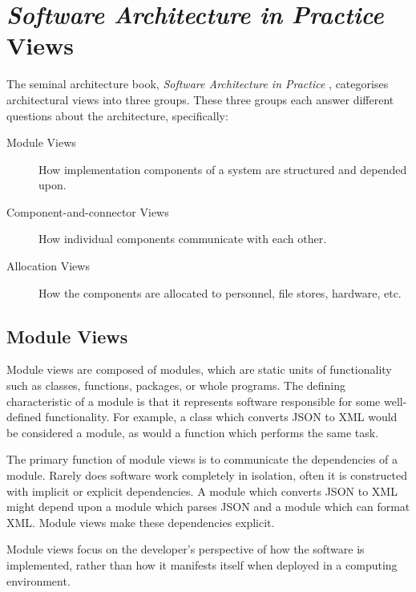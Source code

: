 \section{\textit{Software Architecture in Practice} Views}
The seminal architecture book, \textit{Software Architecture in Practice} \cite{bass2021software},
categorises architectural views into three groups.
These three groups each answer different questions about the architecture, specifically:
\begin{description}
    \item[Module Views] How implementation components of a system are structured and depended upon.
    \item[Component-and-connector Views] How individual components communicate with each other.
    \item[Allocation Views] How the components are allocated to personnel, file stores, hardware, etc.
\end{description}

\subsection{Module Views}
Module views are composed of modules, which are static units of functionality such as classes, functions, packages, or whole programs.
The defining characteristic of a module is that it represents software responsible for some well-defined functionality.
For example, a class which converts JSON to XML would be considered a module, as would a function which performs the same task.

The primary function of module views is to communicate the dependencies of a module.
Rarely does software work completely in isolation, often it is constructed with implicit or explicit dependencies.
A module which converts JSON to XML might depend upon a module which parses JSON and a module which can format XML.
Module views make these dependencies explicit.

Module views focus on the developer's perspective of how the software is implemented, rather than how it manifests itself when deployed in a computing environment.

